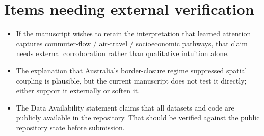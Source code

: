 \documentclass[11pt]{article}
\begin{document}
\section*{Items needing external verification}

\begin{itemize}
\item If the manuscript wishes to retain the interpretation that learned attention captures commuter-flow / air-travel / socioeconomic pathways, that claim needs external corroboration rather than qualitative intuition alone.
\item The explanation that Australia's border-closure regime suppressed spatial coupling is plausible, but the current manuscript does not test it directly; either support it externally or soften it.
\item The Data Availability statement claims that all datasets and code are publicly available in the repository. That should be verified against the public repository state before submission.
\end{itemize}
\end{document}
